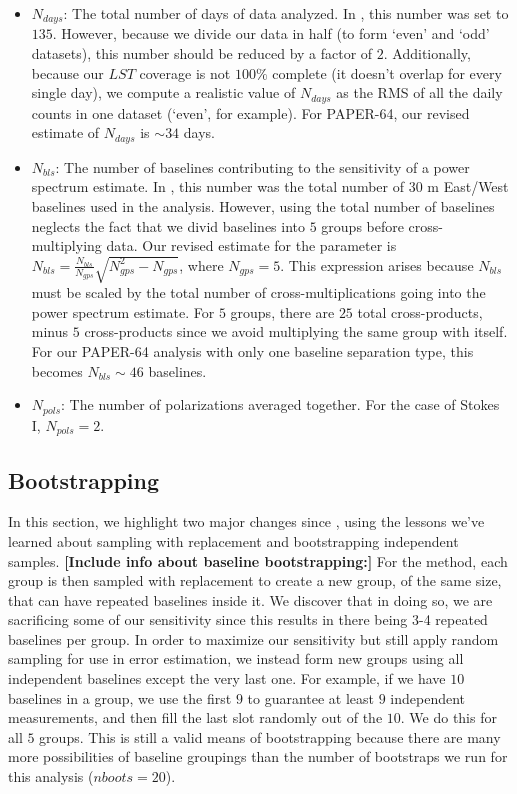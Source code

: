 \documentclass[preprint2,numberedappendix,tighten,twocolappendix]{aastex6}  %
\newcommand{\cc}[1]{{\color{purple} \textbf{[#1]}}}
\begin{document}
\begin{itemize}
\item $N_{days}$: The total number of days of data analyzed. In \citet{ali_et_al2015}, this number was set to $135$. However, because we divide our data in half (to form `even' and `odd' datasets), this number should be reduced by a factor of $2$. Additionally, because our $LST$ coverage is not $100\%$ complete (it doesn't overlap for every single day), we compute a realistic value of $N_{days}$ as the RMS of all the daily counts in one dataset (`even', for example). For PAPER-64, our revised estimate of $N_{days}$ is $\sim34$ days.
\item $N_{bls}$: The number of baselines contributing to the sensitivity of a power spectrum estimate. In \citet{ali_et_al2015}, this number was the total number of $30$ m East/West baselines used in the analysis. However, using the total number of baselines neglects the fact that we divid baselines into $5$ groups before cross-multiplying data. Our revised estimate for the parameter is $N_{bls} = \frac{N_{bls}}{N_{gps}}\sqrt{N_{gps}^{2}-N_{gps}}$, where $N_{gps} = 5$. This expression arises because $N_{bls}$ must be scaled by the total number of cross-multiplications going into the power spectrum estimate. For $5$ groups, there are $25$ total cross-products, minus $5$ cross-products since we avoid multiplying the same group with itself. For our PAPER-64 analysis with only one baseline separation type, this becomes $N_{bls} \sim 46$ baselines. 
\item $N_{pols}$: The number of polarizations averaged together. For the case of Stokes I, $N_{pols}=2$.
\end{itemize}

\subsection{Bootstrapping}
\label{sec:Boot}

In this section, we highlight two major changes since \citet{ali_et_al2015}, using the lessons we've learned about sampling with replacement and bootstrapping independent samples.
\cc{Include info about baseline bootstrapping:}
For the \citet{ali_et_al2015} method, each group is then sampled with replacement to create a new group, of the same size, that can have repeated baselines inside it. We discover that in doing so, we are sacrificing some of our sensitivity since this results in there being 3-4 repeated baselines per group. In order to maximize our sensitivity but still apply random sampling for use in error estimation, we instead form new groups using all independent baselines except the very last one. For example, if we have $10$ baselines in a group, we use the first $9$ to guarantee at least $9$ independent measurements, and then fill the last slot randomly out of the $10$. We do this for all $5$ groups. This is still a valid means of bootstrapping because there are many more possibilities of baseline groupings than the number of bootstraps we run for this analysis ($nboots = 20$).
\end{document}
